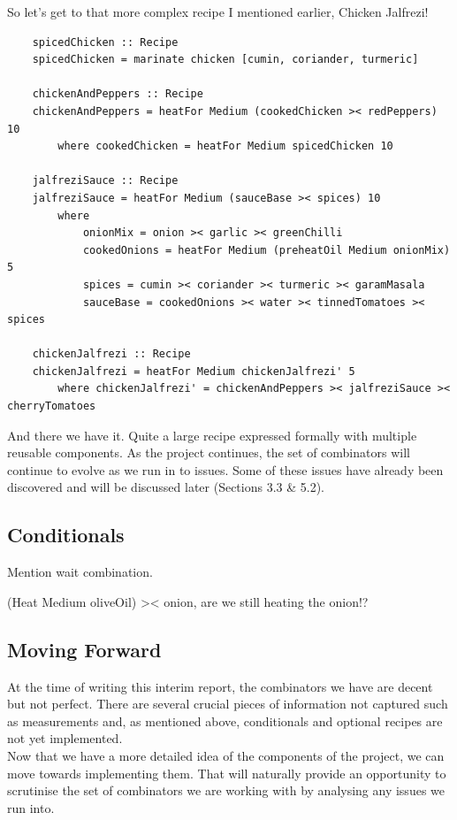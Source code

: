 \documentclass[11pt]{article}
\begin{document}
    So let's get to that more complex recipe I mentioned earlier, Chicken Jalfrezi!
    \begin{tt}
    \small
    \begin{lstlisting}
    spicedChicken :: Recipe
    spicedChicken = marinate chicken [cumin, coriander, turmeric]

    chickenAndPeppers :: Recipe
    chickenAndPeppers = heatFor Medium (cookedChicken >< redPeppers) 10
        where cookedChicken = heatFor Medium spicedChicken 10

    jalfreziSauce :: Recipe
    jalfreziSauce = heatFor Medium (sauceBase >< spices) 10
        where
            onionMix = onion >< garlic >< greenChilli
            cookedOnions = heatFor Medium (preheatOil Medium onionMix) 5
            spices = cumin >< coriander >< turmeric >< garamMasala
            sauceBase = cookedOnions >< water >< tinnedTomatoes >< spices

    chickenJalfrezi :: Recipe
    chickenJalfrezi = heatFor Medium chickenJalfrezi' 5
        where chickenJalfrezi' = chickenAndPeppers >< jalfreziSauce >< cherryTomatoes
    \end{lstlisting}
    \end{tt}
    And there we have it. Quite a large recipe expressed formally with
    multiple reusable components. As the project continues, the set of
    combinators will continue to evolve as we run in to issues. Some of
    these issues have already been discovered and will be discussed later
    (Sections 3.3 & 5.2).

    \subsection{Conditionals}

    Mention wait combination.

    (Heat Medium oliveOil) >< onion, are we still heating the onion!?

    \subsection{Moving Forward}
    At the time of writing this interim report, the combinators we
    have are decent but not perfect. There are several crucial pieces
    of information not captured such as measurements and, as mentioned
    above, conditionals and optional recipes are not yet implemented. \\

    Now that we have a more detailed idea of the components of the project,
    we can move towards implementing them. That will naturally provide
    an opportunity to scrutinise the set of combinators we are working
    with by analysing any issues we run into.
\end{document}

